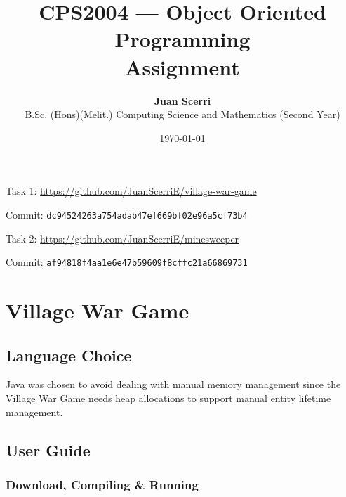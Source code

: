 \documentclass[12pt]{article}
\title{CPS2004 --- Object Oriented Programming\\
\vspace{1em}\textbf{Assignment}}
\date{\today}
\author {{\textbf{Juan Scerri}}\\
B.Sc. (Hons)(Melit.) Computing Science and Mathematics (Second Year)}
\begin{document}

\maketitle %

\thispagestyle{empty} %

\begin{center}
    Task 1: \url{https://github.com/JuanScerriE/village-war-game}
\end{center}
\vspace{-2.4em}
\begin{center}
    Commit: \texttt{dc94524263a754adab47ef669bf02e96a5cf73b4}
\end{center}
\begin{center}
    Task 2: \url{https://github.com/JuanScerriE/minesweeper}
\end{center}
\vspace{-2.4em}
\begin{center}
    Commit: \texttt{af94818f4aa1e6e47b59609f8cffc21a66869731}
\end{center}

\tableofcontents

\listoffigures


\section{Village War Game}

\subsection{Language Choice}

Java was chosen to avoid dealing with manual memory management
since the Village War Game needs heap allocations to support
manual entity lifetime management.

\subsection{User Guide}

\subsubsection{Download, Compiling \& Running}
\end{document}

